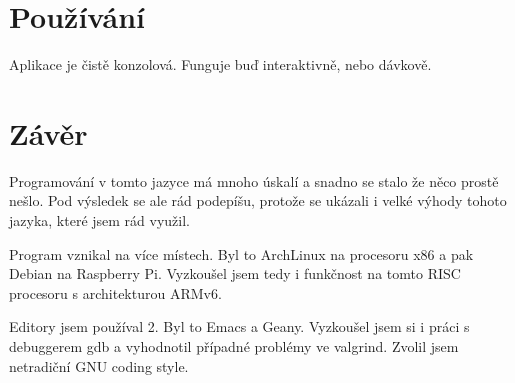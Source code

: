 \documentclass{article}
\begin{document}
\section{Používání}
Aplikace je čistě konzolová. Funguje buď interaktivně, nebo
dávkově.

\section{Závěr}
Programování v tomto jazyce má
mnoho úskalí a snadno se stalo že něco prostě nešlo. Pod výsledek se
ale rád podepíšu, protože se ukázali i velké výhody tohoto jazyka, které
jsem rád využil.

Program vznikal na více místech. Byl to ArchLinux na procesoru x86 a
pak Debian na Raspberry Pi. Vyzkoušel jsem tedy i funkčnost na tomto
RISC procesoru s architekturou ARMv6.

Editory jsem používal 2. Byl to Emacs a Geany. Vyzkoušel jsem si
i práci s debuggerem \textsf{gdb} a vyhodnotil případné problémy
ve \textsf{valgrind}. Zvolil jsem netradiční GNU coding style.
\end{document}
